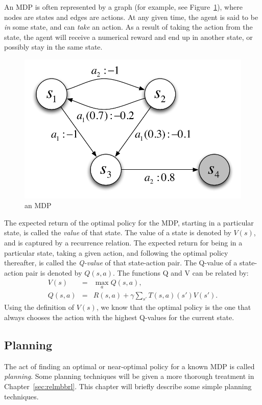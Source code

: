An MDP is often represented by a graph (for example, see Figure~\ref{intro:mdp}), where nodes are states and edges are actions. At any given time, the agent is said to be \emph{in} some state, and can \emph{take} an action. As a result of taking the action from the state, the agent will receive a numerical reward and end up in another state, or possibly stay in the same state.


\begin{figure}[t]
\begin{center}
\includegraphics[width=0.5\linewidth]{figures/mdp.pdf}
\caption{an MDP}
\label{intro:mdp}
\end{center}
\end{figure}



The expected return of the optimal policy for the MDP, starting in a particular state, is called the \emph{value} of that state. The value of a state is denoted by $V(s)$, and is captured by a recurrence relation. The expected return for being in a particular state, taking a given action, and following the optimal policy thereafter, is called the \emph{Q-value} of that state-action pair. The Q-value of a state-action pair is denoted by $Q(s,a)$. The functions Q and V can be related by:
\begin{eqnarray}
\label{intro:eqn:value} V(s) &=& \max_a Q(s,a),\\
\label{intro:eqn:qvalue} Q(s,a) &=& R(s,a) + \gamma \sum_{s'} T(s,a)(s') V(s').
\end{eqnarray}
Using the definition of $V(s)$, we know that the optimal policy is the one that always chooses the action with the highest Q-values for the current state.

\subsection{Planning}

The act of finding an optimal or near-optimal policy for a known MDP is called \emph{planning}. Some planning techniques will be given a more thorough treatment in Chapter~\ref{sec:relmbbrl}. This chapter will briefly describe some simple planning techniques.

